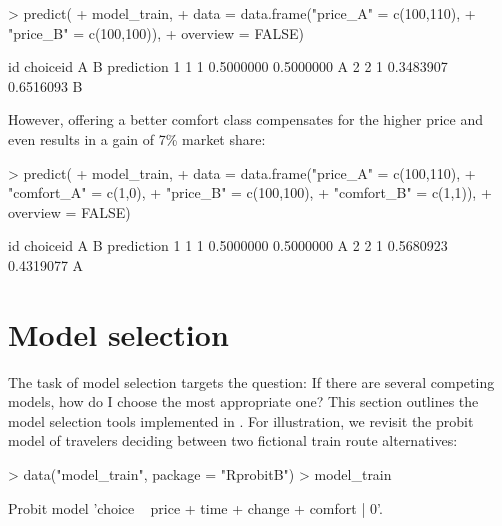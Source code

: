\documentclass[article]{jss}
\begin{document}
\begin{Schunk}
\begin{Sinput}
> predict(
+    model_train,
+    data = data.frame("price_A" = c(100,110),
+                      "price_B" = c(100,100)),
+    overview = FALSE)
\end{Sinput}
\begin{Soutput}
  id choiceid         A         B prediction
1  1        1 0.5000000 0.5000000          A
2  2        1 0.3483907 0.6516093          B
\end{Soutput}
\end{Schunk}

However, offering a better comfort class compensates for the higher price and even results in a gain of 7\% market share:

\begin{Schunk}
\begin{Sinput}
> predict(
+    model_train,
+    data = data.frame("price_A"   = c(100,110),
+                      "comfort_A" = c(1,0),
+                      "price_B"   = c(100,100),
+                      "comfort_B" = c(1,1)),
+    overview = FALSE)
\end{Sinput}
\begin{Soutput}
  id choiceid         A         B prediction
1  1        1 0.5000000 0.5000000          A
2  2        1 0.5680923 0.4319077          A
\end{Soutput}
\end{Schunk}

\section{Model selection} \label{sec:model_selection}

The task of model selection targets the question: If there are several competing models, how do I choose the most appropriate one? This section outlines the model selection tools implemented in . For illustration, we revisit the probit model of travelers deciding between two fictional train route alternatives:

\begin{Schunk}
\begin{Sinput}
> data("model_train", package = "RprobitB")
> model_train
\end{Sinput}
\begin{Soutput}
Probit model 'choice ~ price + time + change + comfort | 0'.
\end{Soutput}
\end{Schunk}
\end{document}
